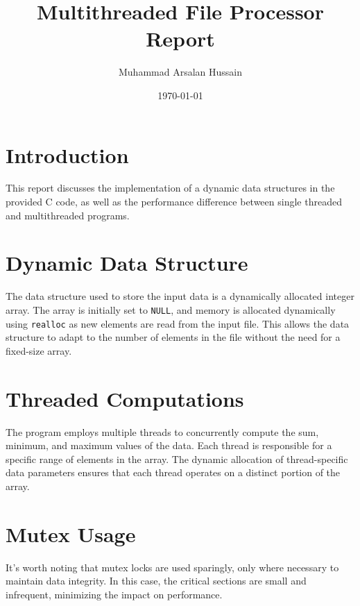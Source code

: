 \documentclass[a4paper,12pt]{article}
\title{Multithreaded File Processor Report}
\author{Muhammad Arsalan Hussain}
\date{\today}
\begin{document}
\maketitle

\section*{Introduction}
This report discusses the implementation of a dynamic data structures in the provided C code, as well as the performance difference between single threaded and multithreaded programs.

\section*{Dynamic Data Structure}
The data structure used to store the input data is a dynamically allocated integer array. The array is initially set to \texttt{NULL}, and memory is allocated dynamically using \texttt{realloc} as new elements are read from the input file. This allows the data structure to adapt to the number of elements in the file without the need for a fixed-size array.

\section*{Threaded Computations}
The program employs multiple threads to concurrently compute the sum, minimum, and maximum values of the data. Each thread is responsible for a specific range of elements in the array. The dynamic allocation of thread-specific data parameters ensures that each thread operates on a distinct portion of the array.

\section*{Mutex Usage}
It's worth noting that mutex locks are used sparingly, only where necessary to maintain data integrity. In this case, the critical sections are small and infrequent, minimizing the impact on performance.
\end{document}
